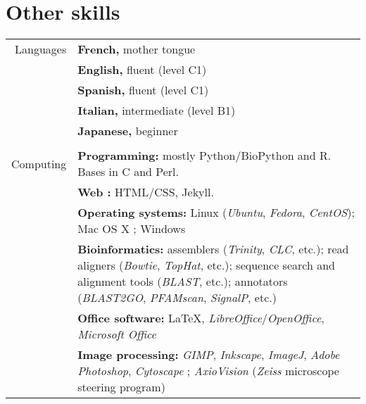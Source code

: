 \documentclass[letterpaper,10pt]{article}
\begin{document}
\section{Other skills}
\begin{tabular}{r|p{13cm}}

Languages
 & \textbf{French,} mother tongue \\
 & \textbf{English,} fluent (level C1) \\
 & \textbf{Spanish,} fluent (level C1) \\
 & \textbf{Italian,} intermediate (level B1) \\
 & \textbf{Japanese,} beginner \\

\multicolumn{2}{c}{} \\

Computing

& \textbf{Programming:} mostly Python/BioPython and R. Bases in C and Perl.
  \vspace{2mm} \\

& \textbf{Web :} HTML/CSS, Jekyll.
  \vspace{2mm} \\

& \textbf{Operating systems:} Linux (\emph{Ubuntu}, \emph{Fedora},
  \emph{CentOS}); Mac OS X ; Windows
  \vspace{2mm} \\

& \textbf{Bioinformatics:} assemblers (\emph{Trinity}, \emph{CLC}, etc.);
  read aligners (\emph{Bowtie}, \emph{TopHat}, etc.);
  sequence search and alignment tools (\emph{BLAST}, etc.);
  annotators (\emph{BLAST2GO}, \emph{PFAMscan}, \emph{SignalP}, etc.)
  \vspace{2mm} \\

& \textbf{Office software:} \LaTeX, \emph{LibreOffice}/\emph{OpenOffice},
  \emph{Microsoft Office}
  \vspace{2mm} \\

& \textbf{Image processing:} \emph{GIMP}, \emph{Inkscape}, \emph{ImageJ},
  \emph{Adobe Photoshop}, \emph{Cytoscape} ; \emph{AxioVision} (\emph{Zeiss}
  microscope steering program) \\

\end{tabular}
\end{document}
